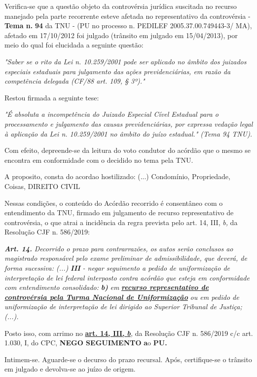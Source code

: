 \documentclass[12pt]{article}
\begin{document}
\justifying
\noindent Verifica-se que a questão objeto da controvérsia jurídica suscitada no recurso manejado pela parte recorrente esteve afetada no representativo da controvérsia - \textbf{Tema n. }\textbf{94} da TNU - (PU no processo n. PEDILEF 2005.37.00.749443-3/ MA),  afetado em 17/10/2012 foi julgado (trânsito em julgado em 15/04/2013), por meio do qual foi elucidada a seguinte questão:

\noindent \textit{"Saber se o rito da Lei n. 10.259/2001 pode ser aplicado no âmbito dos juizados especiais estaduais para julgamento das ações previdenciárias, em razão da competência delegada (CF/88 art. 109, § 3º)."}

\noindent Restou firmada a seguinte tese:

\noindent \textit{"É absoluta a incompetência do Juizado Especial Cível Estadual para o processamento e julgamento das causas previdenciárias, por expressa vedação legal à aplicação da Lei n. 10.259/2001 no âmbito do juízo estadual." (Tema 94 TNU).}

\noindent Com efeito, depreende-se da leitura do voto condutor do acórdão que o mesmo se encontra em conformidade com o decidido no  tema pela TNU.

\noindent A proposito, consta do acordao hostilizado: (...) Condomínio, Propriedade, Coisas, DIREITO CIVIL

\noindent Nessas condições, o conteúdo do Acórdão recorrido é consentâneo com o entendimento da TNU, firmado em julgamento de recurso representativo de controvérsia, o que atrai a incidência da regra prevista pelo art. 14, III, \textit{b,} da Resolução CJF n. 586/2019:

\noindent \textit{\textbf{Art. 14.}}\textit{ Decorrido o prazo para contrarrazões, os autos serão conclusos ao magistrado responsável pelo exame preliminar de admissibilidade, que deverá, de forma sucessiva: (...) }\textit{\textbf{III }}\textit{- negar seguimento a pedido de uniformização de interpretação de lei federal interposto contra acórdão que esteja em conformidade com entendimento consolidado: }\textit{\textbf{b)}}\textit{ em }\uline{\textit{\textbf{recurso representativo de controvérsia pela Turma Nacional de Uniformização}}}\textit{ ou em pedido de uniformização de interpretação de lei dirigido ao Superior Tribunal de Justiça;(...).}

\noindent Posto isso, com arrimo no \uline{\textbf{art. 14, III, }}\uline{\textit{\textbf{b}}}\textit{,} da Resolução CJF n. 586/2019 c/c art. 1.030, I, do CPC, \textbf{NEGO SEGUIMENTO }\textbf{a}o\textbf{ PU}\textbf{.}

\noindent Intimem-se. Aguarde-se o decurso do prazo recursal. Após, certifique-se o trânsito em julgado e devolva-se ao juízo de origem.
\end{document}
